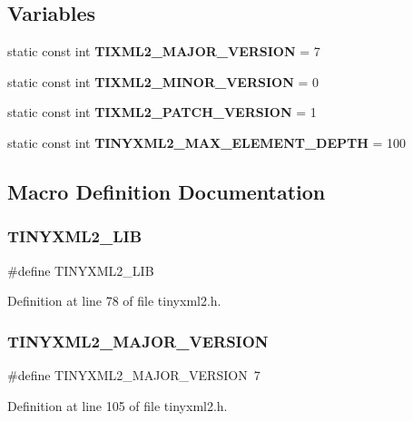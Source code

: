 \subsection*{Variables}
\begin{DoxyCompactItemize}
\item 
static const int \textbf{ T\+I\+X\+M\+L2\+\_\+\+M\+A\+J\+O\+R\+\_\+\+V\+E\+R\+S\+I\+ON} = 7
\item 
static const int \textbf{ T\+I\+X\+M\+L2\+\_\+\+M\+I\+N\+O\+R\+\_\+\+V\+E\+R\+S\+I\+ON} = 0
\item 
static const int \textbf{ T\+I\+X\+M\+L2\+\_\+\+P\+A\+T\+C\+H\+\_\+\+V\+E\+R\+S\+I\+ON} = 1
\item 
static const int \textbf{ T\+I\+N\+Y\+X\+M\+L2\+\_\+\+M\+A\+X\+\_\+\+E\+L\+E\+M\+E\+N\+T\+\_\+\+D\+E\+P\+TH} = 100
\end{DoxyCompactItemize}


\subsection{Macro Definition Documentation}
\mbox{\label{tinyxml2_8h_a8953517b8490d756ad0bfef40fe5811f}} 
\subsubsection{TINYXML2\_LIB}
{\footnotesize\ttfamily \#define T\+I\+N\+Y\+X\+M\+L2\+\_\+\+L\+IB}



Definition at line 78 of file tinyxml2.\+h.

\mbox{\label{tinyxml2_8h_a530d8240c8e91a9ba8b8dae2d0024571}} 
\subsubsection{TINYXML2\_MAJOR\_VERSION}
{\footnotesize\ttfamily \#define T\+I\+N\+Y\+X\+M\+L2\+\_\+\+M\+A\+J\+O\+R\+\_\+\+V\+E\+R\+S\+I\+ON~7}



Definition at line 105 of file tinyxml2.\+h.

\mbox{\label{tinyxml2_8h_ae81f14093bb46006bfba7bbb874f2ad7}} 
